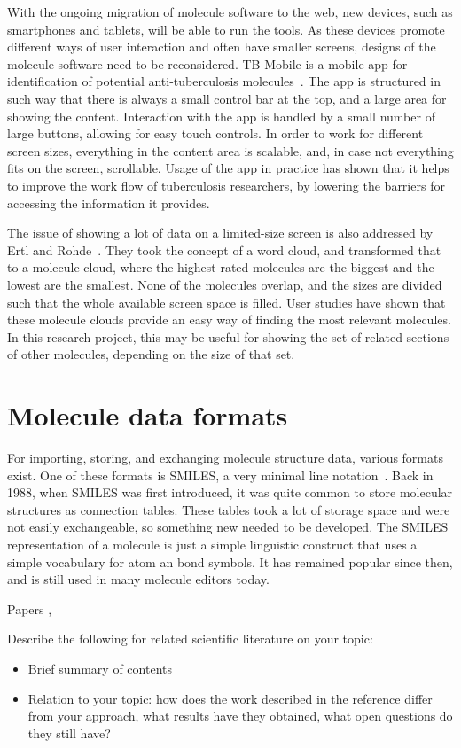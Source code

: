 With the ongoing migration of molecule software to the web, new devices, such as smartphones and tablets, will be able to run the tools. As these devices promote different ways of user interaction and often have smaller screens, designs of the molecule software need to be reconsidered. TB Mobile is a mobile app for identification of potential anti-tuberculosis molecules~\cite{ekins2013tb}. The app is structured in such way that there is always a small control bar at the top, and a large area for showing the content. Interaction with the app is handled by a small number of large buttons, allowing for easy touch controls. In order to work for different screen sizes, everything in the content area is scalable, and, in case not everything fits on the screen, scrollable. Usage of the app in practice has shown that it helps to improve the work flow of tuberculosis researchers, by lowering the barriers for accessing the information it provides.

The issue of showing a lot of data on a limited-size screen is also addressed by Ertl and Rohde~\cite{ertl2012molecule}. They took the concept of a word cloud, and transformed that to a molecule cloud, where the highest rated molecules are the biggest and the lowest are the smallest. None of the molecules overlap, and the sizes are divided such that the whole available screen space is filled. User studies have shown that these molecule clouds provide an easy way of finding the most relevant molecules. In this research project, this may be useful for showing the set of related sections of other molecules, depending on the size of that set.


\section{Molecule data formats}

For importing, storing, and exchanging molecule structure data, various formats exist. One of these formats is SMILES, a very minimal line notation~\cite{daylight1992daylight}. Back in 1988, when SMILES was first introduced, it was quite common to store molecular structures as connection tables. These tables took a lot of storage space and were not easily exchangeable, so something new needed to be developed. The SMILES representation of a molecule is just a simple linguistic construct that uses a simple vocabulary for atom an bond symbols. It has remained popular since then, and is still used in many molecule editors today.




Papers , ~\cite{heller2013inchi}





Describe the following for related scientific literature on your topic:
\begin{itemize}
\item Brief summary of contents
\item Relation to your topic: how does the work described in the reference differ from your approach, what results have they obtained, what open questions do they still have?
\end{itemize}
